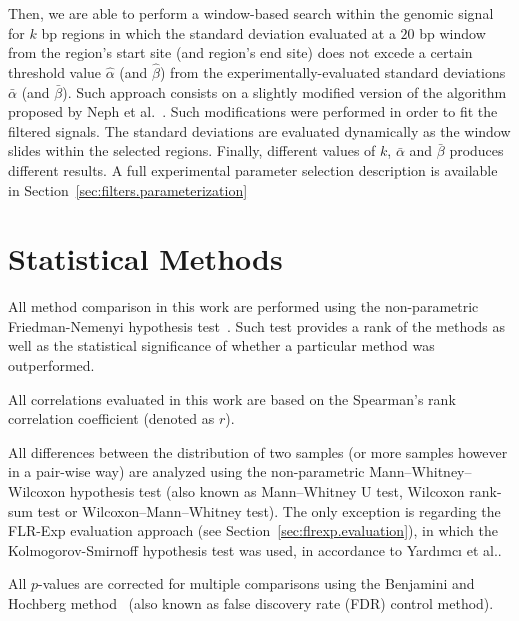 Then, we are able to perform a window-based search within the genomic signal for $ k $ bp regions in which the standard deviation evaluated at a $20$ bp window from the region's start site (and region's end site) does not excede a certain threshold value $ \hat{\alpha} $ (and $ \hat{\beta} $) from the experimentally-evaluated standard deviations $ \bar{\alpha} $ (and $ \bar{\beta} $). Such approach consists on a slightly modified version of the algorithm proposed by Neph et al.~\cite{neph2012a}. Such modifications were performed in order to fit the filtered signals. The standard deviations are evaluated dynamically as the window slides within the selected regions. Finally, different values of $ k $, $ \bar{\alpha} $ and $ \bar{\beta} $ produces different results. A full experimental parameter selection description is available in Section~\ref{sec:filters.parameterization}

\section{Statistical Methods}
\label{sec:statistical.methods}

All method comparison in this work are performed using the non-parametric Friedman-Nemenyi hypothesis test~\cite{demsar2006}. Such test provides a rank of the methods as well as the statistical significance of whether a particular method was outperformed.

All correlations evaluated in this work are based on the Spearman's rank correlation coefficient (denoted as $r$).

All differences between the distribution of two samples (or more samples however in a pair-wise way) are analyzed using the non-parametric Mann–Whitney–Wilcoxon hypothesis test (also known as Mann–Whitney U test, Wilcoxon rank-sum test or Wilcoxon–Mann–Whitney test). The only exception is regarding the FLR-Exp evaluation approach (see Section~\ref{sec:flrexp.evaluation}), in which the Kolmogorov-Smirnoff hypothesis test was used, in accordance to Yard{\i}mc{\i} et al.\cite{yardimci2014}.

All $p$-values are corrected for multiple comparisons using the Benjamini and Hochberg method~\cite{benjamini1995} (also known as false discovery rate (FDR) control method).

